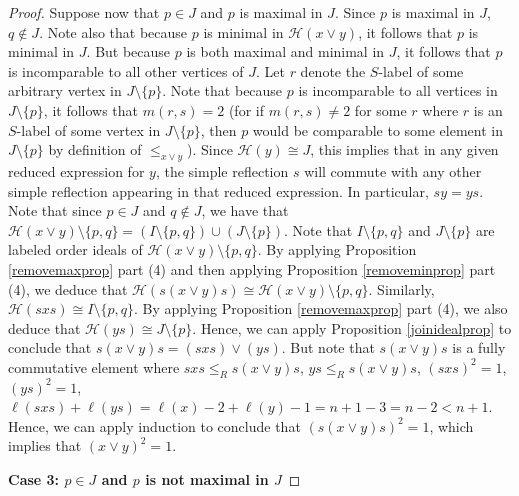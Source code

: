\documentclass{amsart}
\theoremstyle{plain} %
\theoremstyle{definition}
\def\weakr{\leq_{R}}
\def\H#1{\mathcal{H}(#1)}
\begin{document}
\begin{proof}
    Suppose now that $ p\in J$ and $ p$ is maximal in $J$. Since $p$ is maximal in $J$, $ q\notin J$. Note also that because $ p $ is minimal in $\H{x\vee y}$, it follows that $ p$ is minimal in $J$. But because $p$ is both maximal and minimal in $J$, it follows that $p$ is incomparable to all other vertices of $ J$. Let $ r$ denote the $S$-label of some arbitrary vertex in $ J \setminus \{ p \}$. Note that because $ p$ is incomparable to all vertices in $ J \setminus \{ p \}$, it follows that $ m(r,s) = 2$ (for if $ m(r,s) \neq 2$ for some $ r$ where $r$ is an $S$-label of some vertex in $ J \setminus \{ p \}$, then $ p$ would be comparable to some element in $ J \setminus \{ p \}$ by definition of $ \leq_{x\vee y}$). Since $ \H{y} \cong J$, this implies that in any given reduced expression for $y$, the simple reflection $ s$ will commute with any other simple reflection appearing in that reduced expression. In particular, $ sy=ys$. Note that since $ p\in J$ and $ q\notin J$, we have that $ \H{x\vee y} \setminus \{  p,q \} = (I \setminus \{ p,q \}) \cup (J \setminus \{ p\})$. Note that $I \setminus \{  p,q\} $ and $ J \setminus \{ p\}$ are labeled order ideals of $ \H{x\vee y} \setminus \{  p,q \}$. By applying Proposition \ref{removemaxprop} part (4) and then applying Proposition \ref{removeminprop} part (4), we deduce that $ \H{s(x\vee y)s} \cong \H{x\vee y} \setminus \{ p,q \} $. Similarly, $ \H{sxs} \cong I \setminus \{ p,q \}$. By applying Proposition \ref{removemaxprop} part (4), we also deduce that $ \H{ys} \cong J \setminus \{ p \}$. Hence, we can apply Proposition \ref{joinidealprop} to conclude that $ s(x\vee y)s = (sxs) \vee (ys)$. But note that $ s(x\vee y)s$ is a fully commutative element where $sxs \weakr s(x\vee y)s $, $ ys \weakr s(x\vee y)s$, $ (sxs)^{2}  =1$, $ (ys)^{2} = 1$, $ \ell(sxs)+ \ell(ys) = \ell(x) - 2 + \ell(y) -1 = n+1 -3 = n-2< n+1$. Hence, we can apply induction to conclude that $ (s(x\vee y)s)^{2} = 1$, which implies that $ (x\vee y)^{2} = 1$.

    \textbf{Case 3: $p \in J$ and $ p$ is not maximal in $J$}


\end{proof}
\end{document}
